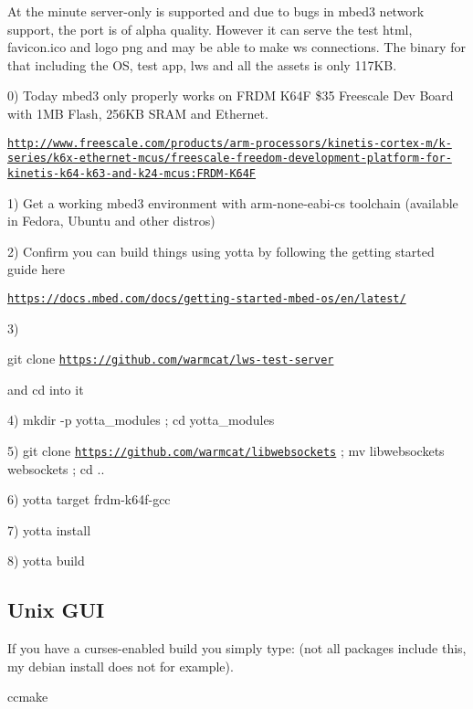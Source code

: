 At the minute server-\/only is supported and due to bugs in mbed3 network support, the port is of alpha quality. However it can serve the test html, favicon.\+ico and logo png and may be able to make ws connections. The binary for that including the OS, test app, lws and all the assets is only 117\+KB.

0) Today mbed3 only properly works on F\+R\+DM K64F \$35 Freescale Dev Board with 1\+MB Flash, 256\+KB S\+R\+AM and Ethernet.

\href{http://www.freescale.com/products/arm-processors/kinetis-cortex-m/k-series/k6x-ethernet-mcus/freescale-freedom-development-platform-for-kinetis-k64-k63-and-k24-mcus:FRDM-K64F}{\tt http\+://www.\+freescale.\+com/products/arm-\/processors/kinetis-\/cortex-\/m/k-\/series/k6x-\/ethernet-\/mcus/freescale-\/freedom-\/development-\/platform-\/for-\/kinetis-\/k64-\/k63-\/and-\/k24-\/mcus\+:\+F\+R\+D\+M-\/\+K64F}

1) Get a working mbed3 environment with arm-\/none-\/eabi-\/cs toolchain (available in Fedora, Ubuntu and other distros)

2) Confirm you can build things using yotta by following the getting started guide here

\href{https://docs.mbed.com/docs/getting-started-mbed-os/en/latest/}{\tt https\+://docs.\+mbed.\+com/docs/getting-\/started-\/mbed-\/os/en/latest/}

3)

git clone \href{https://github.com/warmcat/lws-test-server}{\tt https\+://github.\+com/warmcat/lws-\/test-\/server}

and cd into it

4) mkdir -\/p yotta\+\_\+modules ; cd yotta\+\_\+modules

5) git clone \href{https://github.com/warmcat/libwebsockets}{\tt https\+://github.\+com/warmcat/libwebsockets} ; mv libwebsockets websockets ; cd ..

6) yotta target frdm-\/k64f-\/gcc

7) yotta install

8) yotta build

\subsection*{Unix G\+UI }

If you have a curses-\/enabled build you simply type\+: (not all packages include this, my debian install does not for example). \begin{DoxyVerb}    ccmake
\end{DoxyVerb}


